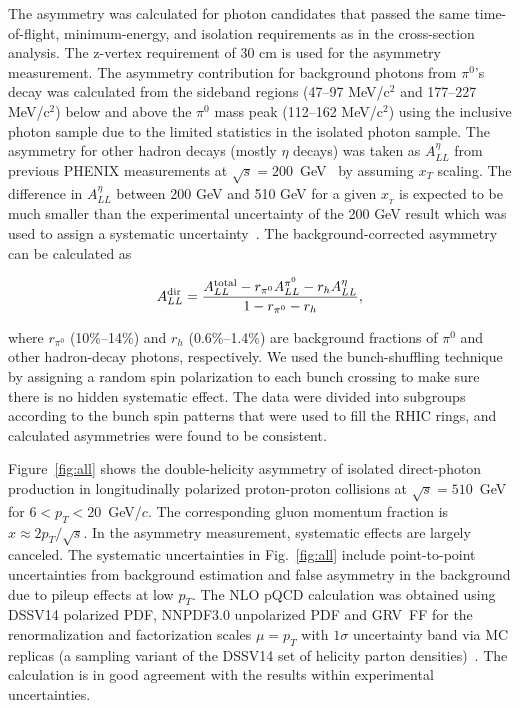 \documentclass[twocolumn,letterpaper,aps,prl,longbibliography,superscriptaddress,floatfix]{revtex4-2}
\newcommand{\pT}{\mbox{$p_T$}\xspace}
\newcommand{\pizero}{\mbox{$\pi^0$}\xspace}
\begin{document}
The asymmetry was calculated for photon candidates that passed the same 
time-of-flight, minimum-energy, and isolation requirements as in the 
cross-section analysis. The z-vertex requirement of 30 cm is used for 
the asymmetry measurement. The asymmetry contribution for background 
photons from \pizero's decay was calculated from the sideband regions 
(47--97 MeV/c$^2$ and 177--227 MeV/c$^2$) below and above the \pizero 
mass peak (112--162 MeV/c$^2$) using the inclusive photon sample due to 
the limited statistics in the isolated photon sample. The asymmetry for 
other hadron decays (mostly $\eta$ decays) was taken as $A_{LL}^{\eta}$ 
from previous PHENIX measurements at 
$\sqrt{s}=200$~GeV~\cite{PhysRevD.90.012007} by assuming $x_T$ scaling. 
The difference in $A^{\eta}_{LL}$ between 200 GeV and 510 GeV for a 
given $x_{_{T}}$ is expected to be much smaller than the experimental 
uncertainty of the 200 GeV result which was used to assign a systematic 
uncertainty~\cite{PhysRevLett.113.012001, 2014276}. The 
background-corrected asymmetry can be calculated as

\begin{equation} \label{eq:all-dir}
A_{LL}^{{\rm dir}} = \frac{A_{LL}^{{\rm total}} - r_{\pi^0}A_{LL}^{\pi^0} -r_h A_{LL}^{\eta}}{1 - r_{\pi^0} - r_h},
\end{equation}

\noindent where $r_{\pi^0}$ (10\%--14\%) and $r_h$ (0.6\%--1.4\%) are background 
fractions of \pizero and other hadron-decay photons, respectively. We 
used the bunch-shuffling technique by assigning a random spin 
polarization to each bunch crossing to make sure there is no hidden 
systematic effect. The data were divided into subgroups according to the 
bunch spin patterns that were used to fill the RHIC rings, and 
calculated asymmetries were found to be consistent.

Figure~\ref{fig:all} shows the double-helicity asymmetry of isolated 
direct-photon production in longitudinally polarized proton-proton 
collisions at $\sqrt{s}=510$~GeV for $6<p_T<20$~GeV/$c$.
The corresponding gluon momentum fraction is $x \approx 2p_T/\sqrt{s}$.
In the asymmetry  measurement, systematic effects are largely canceled.
The systematic uncertainties in Fig.~\ref{fig:all} include point-to-point
uncertainties from background estimation and false asymmetry in the
background due to pileup effects at low \pT.
The NLO pQCD calculation was obtained using DSSV14 polarized PDF, NNPDF3.0 
unpolarized PDF and GRV~FF for the renormalization and factorization 
scales $\mu=p_T$ with $1\sigma$ uncertainty band via MC replicas (a 
sampling variant of the DSSV14 set of helicity parton 
densities)~\cite{PhysRevLett.101.072001,PhysRevLett.113.012001, 
PhysRevD.100.114027}. The calculation is in good agreement with the 
results within experimental uncertainties.
\end{document}

